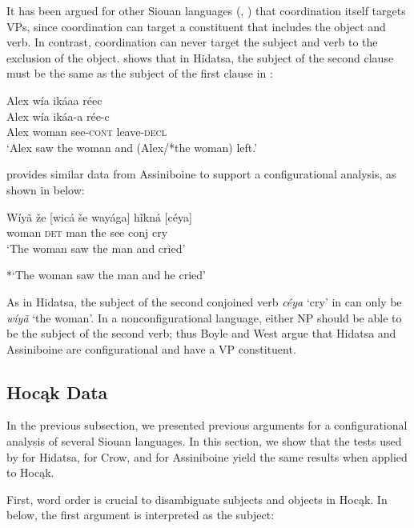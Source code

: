 \documentclass[output=paper]{LSP/langsci}
\begin{document}
It has been argued for other Siouan languages (\citealt{Boyle2007}, \citealt{West2003}) that coordination itself targets VPs, since coordination can target a constituent that includes the object and verb. In contrast, coordination can never target the subject and verb to the exclusion of the object.  \citet{Boyle2007} shows that in Hidatsa, the subject of the second clause must be the same as the subject of the first clause in :

\begin{exe}
\ex 
\glll Alex w\'ia ik\'aaa r\'eec\\
Alex w\'ia ik\'aa-a r\'ee-c \\
Alex woman see-\textsc{cont} leave-\textsc{decl} \\
\trans `Alex saw the woman and (Alex/*the woman) left.' \citep[217]{Boyle2007} 
\end{exe}

\citet{West2003} provides similar data from Assiniboine to support a configurational analysis, as shown in  below:

\begin{exe}
\ex \gll W\'iy\~a 	 \v{z}e 		[wic\'a 	\v{s}e 	way\'aga] h\~ikn\'a 	[c\'eya] \\
woman 	\textsc{det} 	man 		the see 				conj 		cry \\
\trans `The woman saw the man and cried'

*`The woman saw the man and he cried' \citep[34]{West2003}
\end{exe}

As in Hidatsa, the subject of the second conjoined verb \textit{c\'eya} `cry' in  can only be \textit{w\'iy\~a} `the woman'.  In a nonconfigurational language, either NP should be able to be the subject of the second verb; thus Boyle and West argue that Hidatsa and Assiniboine are configurational and have a VP constituent.

\subsection{Hocąk Data}

In the previous subsection, we presented previous arguments for a configurational analysis of several Siouan languages.  In this section, we show that the tests used by \citet{Boyle2007} for Hidatsa, \citet{Graczyk1991} for Crow, and \citet{West2003} for Assiniboine yield the same results when applied to Hocąk.
	
First, word order is crucial to disambiguate subjects and objects in Hocąk.  In  below, the first argument is interpreted as the subject:
\end{document}
